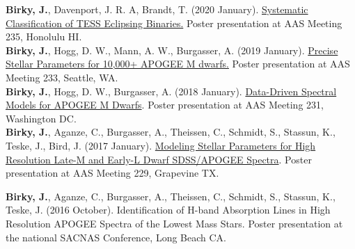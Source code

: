\documentclass[margin,line]{resume}
\begin{document}
\begin{resume}


\textbf{Birky, J.}, Davenport, J. R. A, Brandt, T. (2020 January). \href{https://doi.org/10.5281/zenodo.3605647}{Systematic Classification of TESS Eclipsing Binaries.} Poster presentation at AAS Meeting 235, Honolulu HI. \\
\newline
\textbf{Birky, J.}, Hogg, D. W., Mann, A. W., Burgasser, A. (2019 January). \href{https://doi.org/10.5281/zenodo.2536586}{Precise Stellar Parameters for 10,000+ APOGEE M dwarfs.} Poster presentation at AAS Meeting 233, Seattle, WA. \\
\newline
\textbf{Birky, J.}, Hogg, D. W., Burgasser, A. (2018 January). \href{http://doi.org/10.5281/zenodo.1146909}{Data-Driven Spectral Models for APOGEE M Dwarfs}. Poster presentation at AAS Meeting 231, Washington DC. \\
\newline
\textbf{Birky, J.}, Aganze, C., Burgasser, A., Theissen, C., Schmidt, S., Stassun, K.,  Teske, J., Bird, J. (2017 January). \href{http://doi.org/10.5281/zenodo.1116625}{Modeling Stellar Parameters for High Resolution Late-M and Early-L Dwarf SDSS/APOGEE Spectra}. Poster presentation at AAS Meeting 229, Grapevine TX.  \\
\newline

\newpage
\textbf{Birky, J.}, Aganze, C., Burgasser, A., Theissen, C., Schmidt, S., Stassun, K.,  Teske, J. (2016 October). \color{bcolor}Identification of H-band Absorption Lines in High Resolution APOGEE Spectra of the Lowest Mass Stars\color{black}. Poster presentation at the national SACNAS Conference, Long Beach CA. 





\end{resume}
\end{document}

